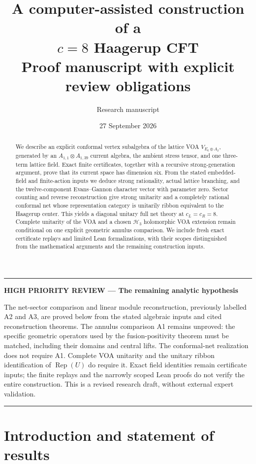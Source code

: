 \documentclass[11pt,a4paper]{article}
\title{A computer-assisted construction of a\\[3pt]
  \texorpdfstring{\(c=8\)}{c=8} Haagerup CFT\\[5pt]
  \large Proof manuscript with explicit review obligations}
\author{Research manuscript}
\date{27 September 2026}
\theoremstyle{definition}
\DeclareMathOperator{\Rep}{Rep}
\newcommand{\HH}{\mathcal H}
\newenvironment{criticalnote}[1]{\par\addvspace{8pt}\begingroup
  \color{BrickRed}\noindent\rule{\linewidth}{1pt}\par\nobreak
  \noindent\textbf{HIGH PRIORITY REVIEW --- #1}\par\nobreak\small\noindent\ignorespaces
}{\par\noindent\rule{\linewidth}{1pt}\par\endgroup\addvspace{8pt}}
\begin{document}
\maketitle
\begin{abstract}
We describe an explicit conformal vertex subalgebra of the lattice VOA
\(V_{E_6\oplus A_2}\), generated by an \(A_{1,1}\otimes A_{1,39}\)
current algebra, the ambient stress tensor, and one three-term lattice field.
Exact finite certificates, together with a recursive strong-generation
argument, prove that its current space has dimension six. From the
stated embedded-field and finite-action inputs we deduce strong
rationality, actual lattice branching, and the twelve-component
Evans--Gannon character vector with parameter zero. Sector counting and
reverse reconstruction give strong unitarity and a completely rational
conformal net whose representation category is unitarily ribbon
equivalent to the Haagerup center. This yields a diagonal unitary full
net theory at $c_L=c_R=8$. Complete unitarity of the VOA and a chosen
$\HH_3$ holomorphic VOA extension remain conditional on one explicit
geometric annulus comparison. We include fresh exact certificate
replays and limited Lean formalizations, with their scopes distinguished
from the mathematical arguments and the remaining construction inputs.
\end{abstract}

\begin{criticalnote}{The remaining analytic hypothesis}
The net-sector comparison and linear module reconstruction, previously
labelled A2 and A3, are proved below from the stated algebraic inputs
and cited reconstruction theorems. The annulus comparison A1 remains
unproved: the specific geometric operators used by the fusion-positivity
theorem must be matched, including their domains and central lifts.
The conformal-net realization does not require A1. Complete VOA
unitarity and the unitary ribbon identification of $\Rep(U)$ do require
it. Exact field identities remain certificate inputs; the finite
replays and the narrowly scoped Lean proofs do not verify the entire
construction. This is a revised research draft, without external
expert validation.
\end{criticalnote}

\clearpage
\tableofcontents
\clearpage

\section{Introduction and statement of results}
\label{sec:statement}
\end{document}
